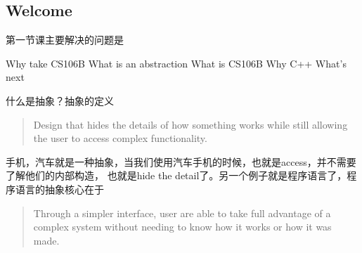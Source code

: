 \subsection{Welcome}
第一节课主要解决的问题是
\begin{outline}
    \1 Why take CS106B
    \1 What is an abstraction
    \1 What is CS106B
    \1 Why C++
    \1 What's next
\end{outline}

什么是抽象？抽象的定义
\begin{quotation}
    Design that hides the details of how something works while still allowing
     the user to access complex functionality.
\end{quotation}
手机，汽车就是一种抽象，当我们使用汽车手机的时候，也就是access，并不需要了解他们的内部构造，
也就是hide the detail了。另一个例子就是程序语言了，程序语言的抽象核心在于
\begin{quotation}
    Through a simpler interface, user are able to take full advantage of a complex 
    system without needing to know how it works or how it was made.
\end{quotation}

